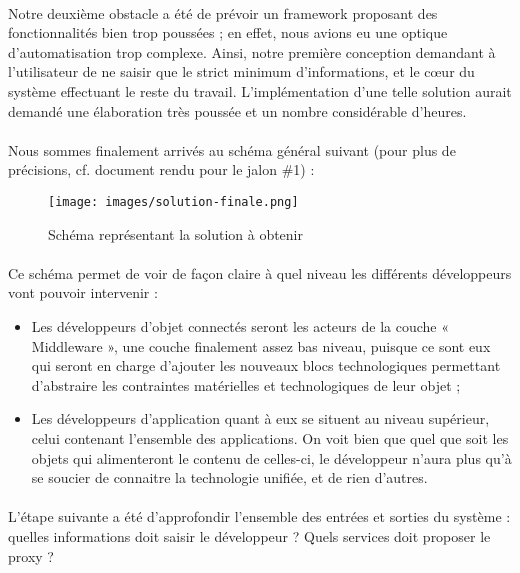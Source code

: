 \documentclass[nocopyrightspace]{sigplanconf}
\begin{document}
			\paragraph{}
			Notre deuxième obstacle a été de prévoir un framework proposant des fonctionnalités bien trop poussées ; en effet, nous avions eu une optique d’automatisation trop complexe. Ainsi, notre première conception demandant à l’utilisateur de ne saisir que le strict minimum d’informations, et le cœur du système effectuant le reste du travail. L’implémentation d’une telle solution aurait demandé une élaboration très poussée et un nombre considérable d’heures. 

			\paragraph{}
			Nous sommes finalement arrivés au schéma général suivant (pour plus de précisions, cf. document rendu pour le jalon \#1) :

			\begin{figure}[h]
				\centering
				\texttt{[image: images/solution-finale.png]}
				\caption{Schéma représentant la solution à obtenir}
			\end{figure}

			\paragraph{}
			Ce schéma permet de voir de façon claire à quel niveau les différents développeurs vont pouvoir intervenir :
			
			\begin{itemize}
				\item Les développeurs d’objet connectés seront les acteurs de la couche « Middleware », une couche finalement assez bas niveau, puisque ce sont eux qui seront en charge d’ajouter les nouveaux blocs technologiques permettant d’abstraire les contraintes matérielles et technologiques de leur objet ;
				\item Les développeurs d’application quant à eux se situent au niveau supérieur, celui contenant l’ensemble des applications. On voit bien que quel que soit les objets qui alimenteront le contenu de celles-ci, le développeur n’aura plus qu’à se soucier de connaitre la technologie unifiée, et de rien d’autres.
			\end{itemize}

			\paragraph{}
			L’étape suivante a été d’approfondir l’ensemble des entrées et sorties du système : quelles informations doit saisir le développeur ? Quels services doit proposer le proxy ?
\end{document}
